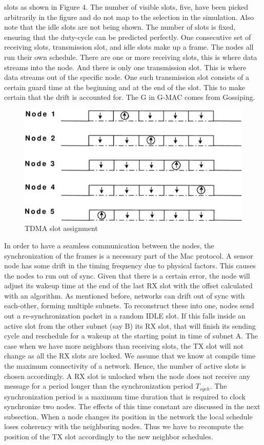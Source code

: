 \documentclass[a4paper,8pt]{report}
\begin{document}
slots as shown in Figure 4. The number of visible slots, five, have
been picked arbitrarily in the figure and do not map to the
selection in the simulation. Also note that the idle slots are not
being shown. The number of slots is fixed, ensuring that the
duty-cycle can be predicted perfectly. One consecutive set of
receiving slots, transmission slot, and idle slots make up a frame.
The nodes all run their own schedule. There are one or more
receiving slots, this is where data streams into the node. And there
is only one transmission slot. This is where data streams out of the
specific node. One such transmission slot consists of a certain
guard time at the beginning and at the end of the slot. This to make
certain that the drift is accounted for. The G in G-MAC comes from
Gossiping.
\begin{figure}
\centering
\includegraphics[width = 0.5 \textwidth]{tdmaschedule}
\caption{TDMA slot assignment}
\end{figure}
In order to have a seamless communication between the nodes, the
synchronization of the frames is a necessary part of the Mac
protocol. A sensor node has some drift in the timing frequency due
to physical factors. This causes the nodes to run out of sync. Given
that there is a certain error, the node will adjust its wakeup time
at the end of the last RX slot with the offset calculated with an
algorithm. As mentioned before, networks can drift out of sync with
each-other, forming multiple subnets. To reconstruct these into one,
nodes send out a re-synchronization packet in a random IDLE slot. If
this falls inside an active slot from the other subnet (say B) its
RX slot, that will finish its sending cycle and reschedule for a
wakeup at the starting point in time of subnet A. The case when we
have more neighbors than receiving slots, the TX slot will not
change as all the RX slots are locked. We assume that we know at
compile time the maximum connectivity of a network. Hence, the
number of active slots is chosen accordingly. A RX slot is unlocked
when the node does not receive any message for a period longer than
the synchronization period $T_{sych}$. The synchronization period is
a maximum time duration that is required to clock synchronize two
nodes. The effects of this time constant are discussed in the next
subsection. When a node changes its position in the network the
local schedule loses coherency with the neighboring nodes. Thus we
have to recompute the position of the TX slot accordingly to the new
neighbor schedules.
\end{document}
